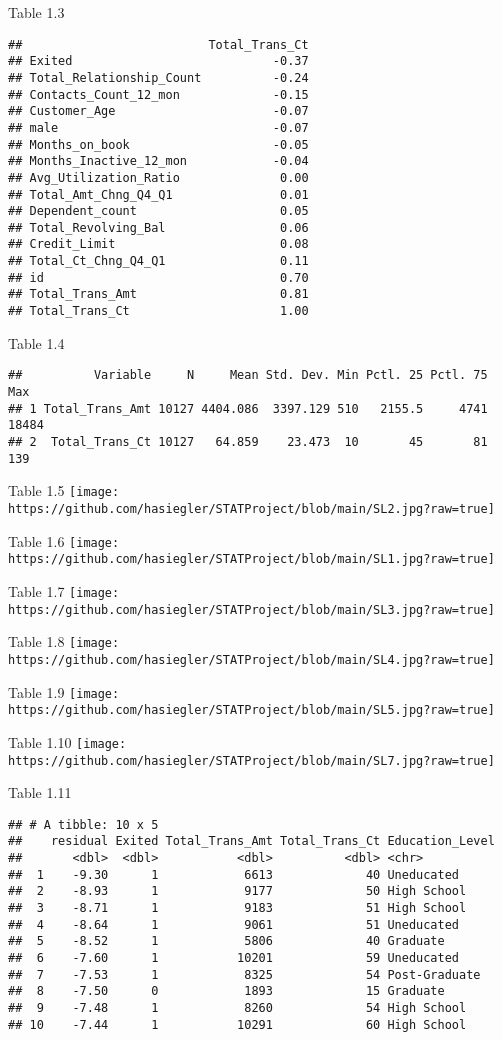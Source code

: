 \documentclass[
]{article}
\begin{document}
Table 1.3

\begin{verbatim}
##                          Total_Trans_Ct
## Exited                            -0.37
## Total_Relationship_Count          -0.24
## Contacts_Count_12_mon             -0.15
## Customer_Age                      -0.07
## male                              -0.07
## Months_on_book                    -0.05
## Months_Inactive_12_mon            -0.04
## Avg_Utilization_Ratio              0.00
## Total_Amt_Chng_Q4_Q1               0.01
## Dependent_count                    0.05
## Total_Revolving_Bal                0.06
## Credit_Limit                       0.08
## Total_Ct_Chng_Q4_Q1                0.11
## id                                 0.70
## Total_Trans_Amt                    0.81
## Total_Trans_Ct                     1.00
\end{verbatim}

Table 1.4

\begin{verbatim}
##          Variable     N     Mean Std. Dev. Min Pctl. 25 Pctl. 75   Max
## 1 Total_Trans_Amt 10127 4404.086  3397.129 510   2155.5     4741 18484
## 2  Total_Trans_Ct 10127   64.859    23.473  10       45       81   139
\end{verbatim}

Table 1.5
\texttt{[image: https://github.com/hasiegler/STATProject/blob/main/SL2.jpg?raw=true]}

Table 1.6
\texttt{[image: https://github.com/hasiegler/STATProject/blob/main/SL1.jpg?raw=true]}

Table 1.7
\texttt{[image: https://github.com/hasiegler/STATProject/blob/main/SL3.jpg?raw=true]}

Table 1.8
\texttt{[image: https://github.com/hasiegler/STATProject/blob/main/SL4.jpg?raw=true]}

Table 1.9
\texttt{[image: https://github.com/hasiegler/STATProject/blob/main/SL5.jpg?raw=true]}

Table 1.10
\texttt{[image: https://github.com/hasiegler/STATProject/blob/main/SL7.jpg?raw=true]}

Table 1.11

\begin{verbatim}
## # A tibble: 10 x 5
##    residual Exited Total_Trans_Amt Total_Trans_Ct Education_Level
##       <dbl>  <dbl>           <dbl>          <dbl> <chr>          
##  1    -9.30      1            6613             40 Uneducated     
##  2    -8.93      1            9177             50 High School    
##  3    -8.71      1            9183             51 High School    
##  4    -8.64      1            9061             51 Uneducated     
##  5    -8.52      1            5806             40 Graduate       
##  6    -7.60      1           10201             59 Uneducated     
##  7    -7.53      1            8325             54 Post-Graduate  
##  8    -7.50      0            1893             15 Graduate       
##  9    -7.48      1            8260             54 High School    
## 10    -7.44      1           10291             60 High School
\end{verbatim}
\end{document}
